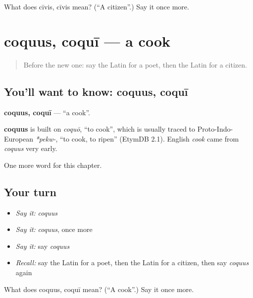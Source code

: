 \begin{tcolorbox}[breakable,colback=teal!4,colframe=teal!35!black,title={Before you move on}]
What does cīvis, cīvis mean? (\textquotedblleft{}A citizen\textquotedblright{}.) Say it once more.
\end{tcolorbox}
\section[coquus, coquī]{coquus, coquī — a cook}

\label{lesson:LA-C74-coquus}



\begin{quote}
Before the new one: say the Latin for a poet, then the Latin for a citizen.
\end{quote}

\subsection*{You'll want to know: coquus, coquī}
\textbf{coquus, coquī} — \textquotedblleft{}a cook\textquotedblright{}.

\begin{cousinweb}
\textbf{coquus} is built on \emph{coquō}, \textquotedblleft{}to cook\textquotedblright{}, which is usually traced to Proto-Indo-European \emph{*pekw-}, \textquotedblleft{}to cook, to ripen\textquotedblright{} (EtymDB 2.1). English \emph{cook} came from \emph{coquus} very early.
\end{cousinweb}

\begin{grammarlens}[title={What you've built}]
One more word for this chapter.
\end{grammarlens}

\subsection*{Your turn}
\begin{itemize}
\raggedright
  \item \emph{Say it:} \emph{coquus}
  \item \emph{Say it:} \emph{coquus}, once more
  \item \emph{Say it:} say \emph{coquus}
  \item \emph{Recall:} say the Latin for a poet, then the Latin for a citizen, then say \emph{coquus} again
\end{itemize}

\begin{tcolorbox}[breakable,colback=teal!4,colframe=teal!35!black,title={Before you move on}]
What does coquus, coquī mean? (\textquotedblleft{}A cook\textquotedblright{}.) Say it once more.
\end{tcolorbox}

